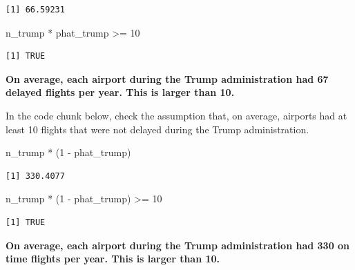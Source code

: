 \documentclass[
  letterpaper,
  DIV=11,
  numbers=noendperiod]{scrartcl}
\newenvironment{Shaded}{\begin{snugshade}}{\end{snugshade}}
\newcommand{\DecValTok}[1]{\textcolor[rgb]{0.68,0.00,0.00}{#1}}
\newcommand{\NormalTok}[1]{\textcolor[rgb]{0.00,0.23,0.31}{#1}}
\newcommand{\SpecialCharTok}[1]{\textcolor[rgb]{0.37,0.37,0.37}{#1}}
\begin{document}
\begin{verbatim}
[1] 66.59231
\end{verbatim}

\begin{Shaded}
\begin{Highlighting}[]
\NormalTok{n\_trump }\SpecialCharTok{*}\NormalTok{ phat\_trump }\SpecialCharTok{\textgreater{}=} \DecValTok{10}
\end{Highlighting}
\end{Shaded}

\begin{verbatim}
[1] TRUE
\end{verbatim}

\begin{tcolorbox}[enhanced jigsaw, colback=white, breakable, arc=.35mm, left=2mm, colframe=quarto-callout-warning-color-frame, opacityback=0, rightrule=.15mm, toprule=.15mm, bottomrule=.15mm, leftrule=.75mm]

\textbf{On average, each airport during the Trump administration had 67
delayed flights per year. This is larger than 10.}

\end{tcolorbox}

In the code chunk below, check the assumption that, on average, airports
had at least 10 flights that were not delayed during the Trump
administration.

\begin{Shaded}
\begin{Highlighting}[]
\NormalTok{n\_trump }\SpecialCharTok{*}\NormalTok{ (}\DecValTok{1} \SpecialCharTok{{-}}\NormalTok{ phat\_trump)}
\end{Highlighting}
\end{Shaded}

\begin{verbatim}
[1] 330.4077
\end{verbatim}

\begin{Shaded}
\begin{Highlighting}[]
\NormalTok{n\_trump }\SpecialCharTok{*}\NormalTok{ (}\DecValTok{1} \SpecialCharTok{{-}}\NormalTok{ phat\_trump) }\SpecialCharTok{\textgreater{}=} \DecValTok{10}
\end{Highlighting}
\end{Shaded}

\begin{verbatim}
[1] TRUE
\end{verbatim}

\begin{tcolorbox}[enhanced jigsaw, colback=white, breakable, arc=.35mm, left=2mm, colframe=quarto-callout-warning-color-frame, opacityback=0, rightrule=.15mm, toprule=.15mm, bottomrule=.15mm, leftrule=.75mm]

\textbf{On average, each airport during the Trump administration had 330
on time flights per year. This is larger than 10.}

\end{tcolorbox}
\end{document}
